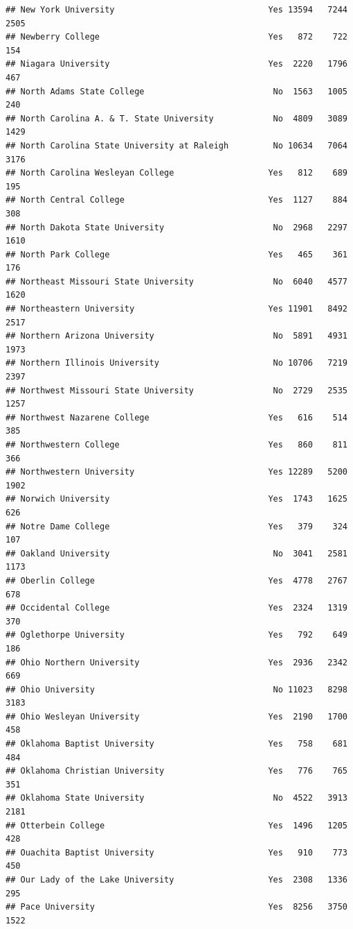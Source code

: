 \documentclass[
]{article}
\begin{document}
\begin{verbatim}
## New York University                               Yes 13594   7244   2505
## Newberry College                                  Yes   872    722    154
## Niagara University                                Yes  2220   1796    467
## North Adams State College                          No  1563   1005    240
## North Carolina A. & T. State University            No  4809   3089   1429
## North Carolina State University at Raleigh         No 10634   7064   3176
## North Carolina Wesleyan College                   Yes   812    689    195
## North Central College                             Yes  1127    884    308
## North Dakota State University                      No  2968   2297   1610
## North Park College                                Yes   465    361    176
## Northeast Missouri State University                No  6040   4577   1620
## Northeastern University                           Yes 11901   8492   2517
## Northern Arizona University                        No  5891   4931   1973
## Northern Illinois University                       No 10706   7219   2397
## Northwest Missouri State University                No  2729   2535   1257
## Northwest Nazarene College                        Yes   616    514    385
## Northwestern College                              Yes   860    811    366
## Northwestern University                           Yes 12289   5200   1902
## Norwich University                                Yes  1743   1625    626
## Notre Dame College                                Yes   379    324    107
## Oakland University                                 No  3041   2581   1173
## Oberlin College                                   Yes  4778   2767    678
## Occidental College                                Yes  2324   1319    370
## Oglethorpe University                             Yes   792    649    186
## Ohio Northern University                          Yes  2936   2342    669
## Ohio University                                    No 11023   8298   3183
## Ohio Wesleyan University                          Yes  2190   1700    458
## Oklahoma Baptist University                       Yes   758    681    484
## Oklahoma Christian University                     Yes   776    765    351
## Oklahoma State University                          No  4522   3913   2181
## Otterbein College                                 Yes  1496   1205    428
## Ouachita Baptist University                       Yes   910    773    450
## Our Lady of the Lake University                   Yes  2308   1336    295
## Pace University                                   Yes  8256   3750   1522

\end{verbatim}
\end{document}
